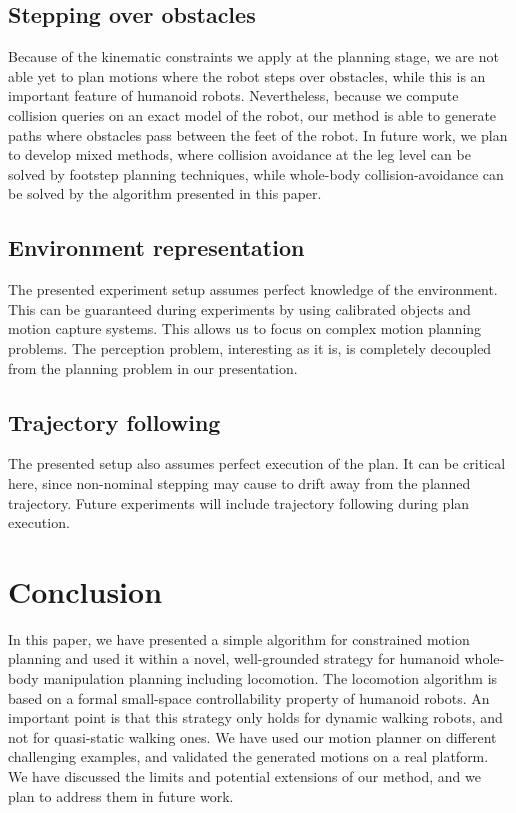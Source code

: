 \documentclass{article}
\begin{document}
\subsection{Stepping over obstacles}

Because of the kinematic constraints we apply at the planning stage, we are not
able yet to plan motions where the robot steps over obstacles, while this is an 
important feature of humanoid robots. Nevertheless, because we compute collision queries on
an exact model of the robot, our method is able to generate paths where obstacles
pass between the feet of the robot.
In future work, we plan to develop mixed
methods, where collision avoidance at the leg level can be solved by footstep
planning techniques, while whole-body collision-avoidance can be solved by the
algorithm presented in this paper.

\subsection{Environment representation}

The presented experiment setup assumes perfect knowledge of the environment. This can
be guaranteed during experiments by using calibrated objects and motion capture systems.
This allows us to focus on complex motion planning problems. The perception problem,
interesting as it is, is completely decoupled from the planning problem in our
presentation. 


\subsection{Trajectory following}

The presented setup also assumes perfect execution of the plan. It can be 
critical here, since
non-nominal stepping may cause to drift away from the planned trajectory. Future 
experiments will  include trajectory following during plan execution.

\section{Conclusion}

In this paper, we have presented a simple algorithm for constrained motion planning
and used it within a novel, well-grounded strategy for humanoid whole-body
manipulation planning including locomotion. The locomotion algorithm is based on a formal
small-space controllability property of humanoid robots. An important point is that
this strategy only holds for dynamic walking robots, and not for quasi-static walking ones.
We have used our motion planner on different challenging examples, and validated the
generated motions on a real platform. We have discussed the limits and potential extensions
of our method, and we plan to address them in future work.


   



\end{document}
